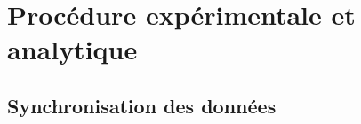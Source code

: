 \section{Procédure expérimentale et analytique}
%
%
%
%
%

\subsection{Synchronisation des données}

